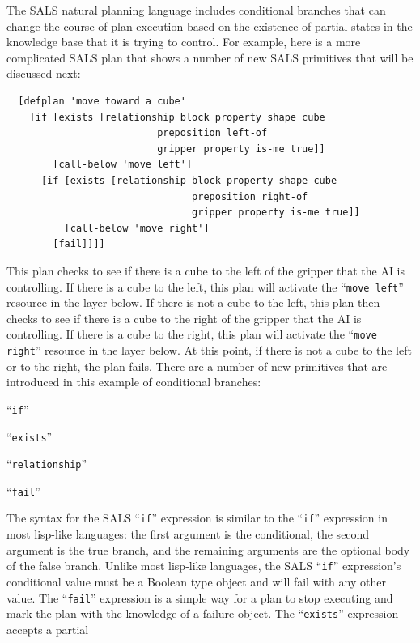 The SALS natural planning language includes conditional branches that
can change the course of plan execution based on the existence of
partial states in the knowledge base that it is trying to control.
For example, here is a more complicated SALS plan that shows a number
of new SALS primitives that will be discussed next:
\begin{samepage}
\begin{Verbatim}
  [defplan 'move toward a cube'
    [if [exists [relationship block property shape cube
	                      preposition left-of
	                      gripper property is-me true]]
        [call-below 'move left']
      [if [exists [relationship block property shape cube
                                preposition right-of
                                gripper property is-me true]]
          [call-below 'move right']
        [fail]]]]
\end{Verbatim}
\end{samepage}
This plan checks to see if there is a cube to the left of the gripper
that the AI is controlling.  If there is a cube to the left, this plan
will activate the ``{\tt{move left}}'' resource in the layer below.
If there is not a cube to the left, this plan then checks to see if
there is a cube to the right of the gripper that the AI is
controlling.  If there is a cube to the right, this plan will activate
the ``{\tt{move right}}'' resource in the layer below.  At this point,
if there is not a cube to the left or to the right, the plan fails.
There are a number of new primitives that are introduced in this
example of conditional branches:
\begin{packed_itemize}
\item{``{\tt{if}}''}
\item{``{\tt{exists}}''}
\item{``{\tt{relationship}}''}
\item{``{\tt{fail}}''}
\end{packed_itemize}
The syntax for the SALS ``{\tt{if}}'' expression is similar to the
``{\tt{if}}'' expression in most lisp-like languages: the first
argument is the conditional, the second argument is the true branch,
and the remaining arguments are the optional body of the false branch.
Unlike most lisp-like languages, the SALS ``{\tt{if}}'' expression's
conditional value must be a Boolean type object and will fail with any
other value.  The ``{\tt{fail}}'' expression is a simple way for a
plan to stop executing and mark the plan with the knowledge of a
failure object.  The ``{\tt{exists}}'' expression accepts a partial
